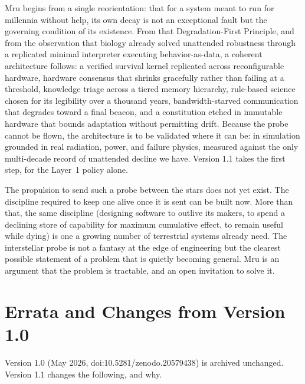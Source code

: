 \documentclass[10pt, a4paper]{article}
\begin{document}
Mru begins from a single reorientation: that for a system meant to run for millennia without help, its own decay is not an exceptional fault but the governing condition of its existence. From that Degradation-First Principle, and from the observation that biology already solved unattended robustness through a replicated minimal interpreter executing behavior-as-data, a coherent architecture follows: a verified survival kernel replicated across reconfigurable hardware, hardware consensus that shrinks gracefully rather than failing at a threshold, knowledge triage across a tiered memory hierarchy, rule-based science chosen for its legibility over a thousand years, bandwidth-starved communication that degrades toward a final beacon, and a constitution etched in immutable hardware that bounds adaptation without permitting drift. Because the probe cannot be flown, the architecture is to be validated where it can be: in simulation grounded in real radiation, power, and failure physics, measured against the only multi-decade record of unattended decline we have. Version 1.1 takes the first step, for the Layer~1 policy alone.

The propulsion to send such a probe between the stars does not yet exist. The discipline required to keep one alive once it is sent can be built now. More than that, the same discipline (designing software to outlive its makers, to spend a declining store of capability for maximum cumulative effect, to remain useful while dying) is one a growing number of terrestrial systems already need. The interstellar probe is not a fantasy at the edge of engineering but the clearest possible statement of a problem that is quietly becoming general. Mru is an argument that the problem is tractable, and an open invitation to solve it.

\section*{Errata and Changes from Version 1.0}

Version 1.0 (May 2026, doi:10.5281/zenodo.20579438) is archived unchanged. Version 1.1 changes the following, and why.
\end{document}
